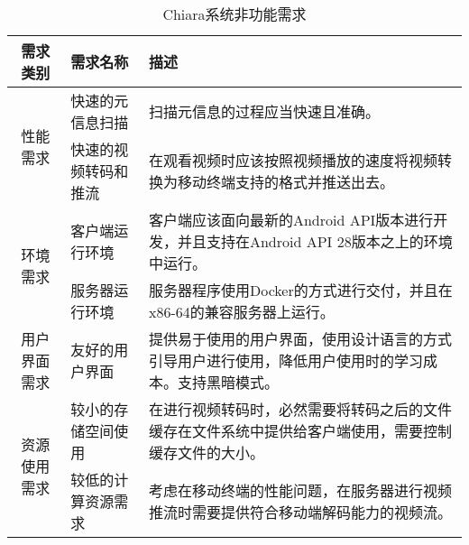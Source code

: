 \documentclass[main.tex]{subfiles}
\begin{document}
\begin{longtable}{cp{6cm}p{6cm}}
    \caption{Chiara系统非功能需求}
    \label{tab:non-function-requirements} \\
    \toprule
    \textbf{需求类别} & \textbf{需求名称} & \textbf{描述} \\
    \midrule
    \endhead
    \multirow{2}{*}{性能需求} & 快速的元信息扫描 & 扫描元信息的过程应当快速且准确。 \\
    \cmidrule{2-3}
    & 快速的视频转码和推流 & 在观看视频时应该按照视频播放的速度将视频转换为移动终端支持的格式并推送出去。 \\
    \midrule
    \multirow{2}{*}{环境需求} & 客户端运行环境 & 客户端应该面向最新的Android API版本进行开发，并且支持在Android API 28版本之上的环境中运行。 \\
    \cmidrule{2-3}
    & 服务器运行环境 & 服务器程序使用Docker的方式进行交付，并且在x86-64的兼容服务器上运行。\\
    \midrule
    用户界面需求 & 友好的用户界面 & 提供易于使用的用户界面，使用设计语言的方式引导用户进行使用，降低用户使用时的学习成本。支持黑暗模式。 \\
    \midrule
    \multirow{2}{*}{资源使用需求} & 较小的存储空间使用 & 在进行视频转码时，必然需要将转码之后的文件缓存在文件系统中提供给客户端使用，需要控制缓存文件的大小。\\
    & 较低的计算资源需求 & 考虑在移动终端的性能问题，在服务器进行视频推流时需要提供符合移动端解码能力的视频流。\\
    \bottomrule
\end{longtable}
\end{document}
